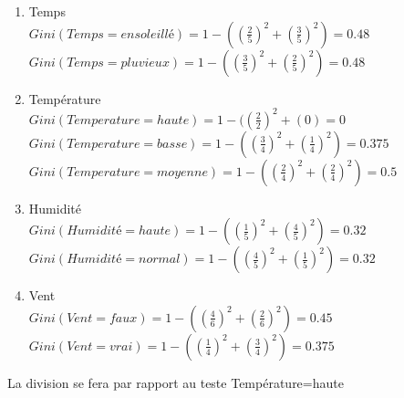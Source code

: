 \documentclass[a4paper, 11pt]{report}
\begin{document}
\begin{enumerate}
\item Temps\\
$Gini(Temps = ensoleillé) = 1 - ((\frac{2}{5})^2 + (\frac{3}{5})^2)=0.48 $\\
$Gini(Temps = pluvieux) = 1 - ((\frac{3}{5})^2 + (\frac{2}{5})^2)=0.48 $\\
\item Température\\
$Gini(Temperature = haute) = 1 - ((\frac{2}{2})^2 + ( 0 )=0 $\\
$Gini(Temperature = basse) = 1 - ((\frac{3}{4})^2 + (\frac{1}{4})^2)=0.375 $\\
$Gini(Temperature = moyenne) = 1 - ((\frac{2}{4})^2 + (\frac{2}{4})^2)=0.5 $\\

\item Humidité\\
$Gini(Humidité = haute) = 1 - ((\frac{1}{5})^2 + (\frac{4}{5})^2)=0.32 $\\
$Gini(Humidité = normal) = 1 - ((\frac{4}{5})^2 + (\frac{1}{5})^2)=0.32 $\\

\item Vent\\
$Gini(Vent = faux) = 1 - ((\frac{4}{6})^2 + (\frac{2}{6})^2)=0.45 $\\
$Gini(Vent = vrai) = 1 - ((\frac{1}{4})^2 + (\frac{3}{4})^2)=0.375 $
\end{enumerate}
La division se fera par rapport au teste Température=haute
\end{document}
